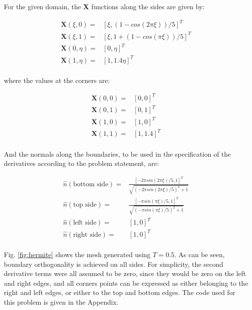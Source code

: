 \documentclass[10pt]{article}
\begin{document}
For the given domain, the \textbf{X} functions along the sides are given by:

\begin{equation}
\begin{aligned}
\textbf{X}(\xi, 0)=& \left\lbrack\xi, (1-cos(2\pi\xi))/5\right\rbrack^T\\
\textbf{X}(\xi, 1)=& \left\lbrack\xi, 1+(1-cos(\pi \xi))/5\right\rbrack^T\\
\textbf{X}(0, \eta)=& \left\lbrack0, \eta\right\rbrack^T\\
\textbf{X}(1, \eta)=& \left\lbrack1, 1.4\eta\right\rbrack^T\\
\end{aligned}
\end{equation}

where the values at the corners are:

\begin{equation}
\begin{aligned}
\textbf{X}(0, 0)=& \left\lbrack0, 0\right\rbrack^T\\
\textbf{X}(0, 1)=& \left\lbrack0, 1\right\rbrack^T\\
\textbf{X}(1, 0)=& \left\lbrack1, 0\right\rbrack^T\\
\textbf{X}(1, 1)=& \left\lbrack1, 1.4\right\rbrack^T\\
\end{aligned}
\end{equation}

And the normals along the boundaries, to be used in the specification of the derivatives according to the problem statement, are:

\begin{equation}
\begin{aligned}
\hat{n}(\textrm{bottom side})=&\frac{\left\lbrack-2\pi sin(2\pi\xi)/5, 1\right\rbrack^T}{\sqrt{(-2\pi sin(2\pi\xi)/5)^2+1}}\\
\hat{n}(\textrm{top side})=&\frac{\left\lbrack-\pi sin(\pi\xi)/5, 1\right\rbrack^T}{\sqrt{(-\pi sin(\pi\xi)/5)^2+1}}\\
\hat{n}(\textrm{left side})=&\left\lbrack1, 0\right\rbrack^T\\
\hat{n}(\textrm{right side})=&\left\lbrack1, 0\right\rbrack^T\\
\end{aligned}
\end{equation}

Fig. \ref{fig:hermite} shows the mesh generated using \(T=0.5\). As can be seen, boundary orthogonality is achieved on all sides. For simplicity, the second derivative terms were all assumed to be zero, since they would be zero on the left and right edges, and all corners points can be expressed as either belonging to the right and left edges, or either to the top and bottom edges. The code used for this problem is given in the Appendix.
\end{document}
